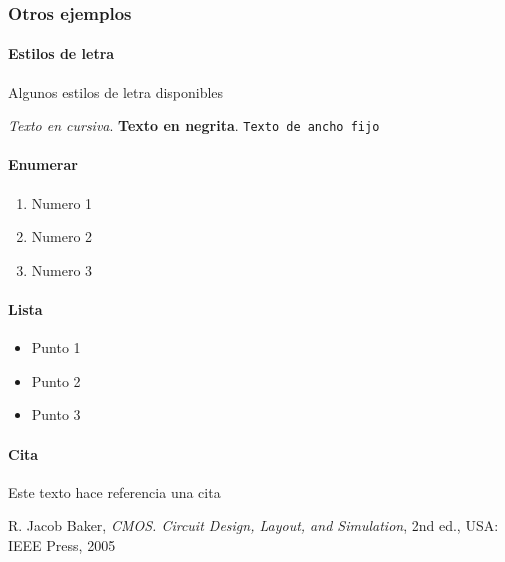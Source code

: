 \documentclass[11pt,letterpaper]{article}
\begin{document}
\subsubsection{Otros ejemplos}

\paragraph{Estilos de letra}
Algunos estilos de letra disponibles

\textit{Texto en cursiva}. \textbf{Texto en negrita}. \texttt{Texto de ancho fijo}\\

\paragraph{Enumerar}

\begin{enumerate}
	\item Numero 1
	\item Numero 2
	\item Numero 3
\end{enumerate}

\paragraph{Lista}

\begin{itemize}
	\item Punto 1
	\item Punto 2
	\item Punto 3
\end{itemize}

\paragraph{Cita}

Este texto hace referencia una cita \cite{cmos}


\newpage
\newpage
\begin{thebibliography}{5}
	 R. Jacob Baker, \textit{CMOS. Circuit Design, Layout, and Simulation}, 2nd ed., USA: IEEE Press, 2005
	
\end{thebibliography}


\end{document}
